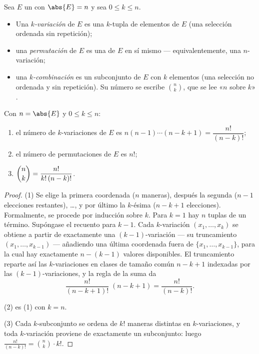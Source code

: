 \begin{definition}\label{def:b1:counting:objects}
Sea $E$ un  con $\abs{E} = n$ y sea $0 \leq k \leq n$.
\begin{itemize}
  \item Una \emph{$k$-variación} de $E$ es una $k$-tupla  de
        elementos de $E$ (una selección ordenada sin repetición);
  \item una \emph{permutación} de $E$ es una
         de $E$ en sí mismo --- equivalentemente, una
        $n$-variación;
  \item una \emph{$k$-combinación} es un subconjunto de $E$ con $k$
        elementos (una selección no ordenada y sin repetición). Su
        número se escribe $\binom{n}{k}$, que se lee «$n$ sobre $k$»
        .
\end{itemize}
\end{definition}

\begin{theorem}\label{thm:b1:counting:counts}
Con $n = \abs{E}$ y $0 \leq k \leq n$:
\begin{enumerate}
  \item el número de $k$-variaciones de $E$ es $n (n-1) \cdots
        (n-k+1) = \dfrac{n!}{(n-k)!}$;
  \item el número de permutaciones de $E$ es $n!$;
  \item $\dbinom{n}{k} = \dfrac{n!}{k!\,(n-k)!}$.
\end{enumerate}
\end{theorem}

\begin{proof}
(1) Se elige la primera coordenada ($n$ maneras), después la segunda
($n - 1$ elecciones restantes), \dots, y por último la $k$-ésima
($n - k + 1$ elecciones). Formalmente, se procede por inducción sobre
$k$. Para $k = 1$ hay $n$ tuplas  de un término. Supóngase
el recuento para $k - 1$. Cada $k$-variación $(x_1, \dots, x_k)$ se
obtiene a partir de exactamente una $(k-1)$-variación --- su
truncamiento $(x_1, \dots, x_{k-1})$ --- añadiendo una última
coordenada fuera de $\{x_1, \dots, x_{k-1}\}$, para la cual hay
exactamente $n - (k - 1)$ valores disponibles. El truncamiento
reparte así las $k$-variaciones en clases de tamaño común
$n - k + 1$ indexadas por las $(k-1)$-variaciones, y la regla de la
suma da
\[
\frac{n!}{(n-k+1)!}\;(n - k + 1) = \frac{n!}{(n-k)!} .
\]

(2) es (1) con $k = n$.

(3) Cada $k$-subconjunto se ordena de $k!$ maneras distintas en
$k$-variaciones, y toda $k$-variación proviene de exactamente un
subconjunto: luego $\frac{n!}{(n-k)!} = \binom nk \cdot k!$.
\end{proof}

